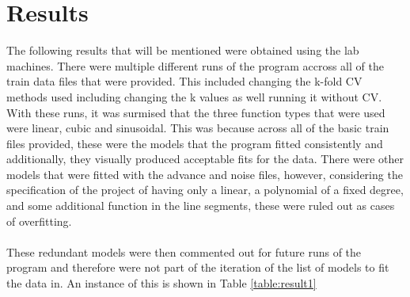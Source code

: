\documentclass[a4paper,11pt]{article}
\begin{document}
\section{Results}
The following results that will be mentioned were obtained using the lab machines.
There were multiple different runs of the program accross all of the train data
files that were provided. This included changing the k-fold CV methods used including
changing the k values as well running it without CV. With these runs, it was
surmised that the three function types that were used were linear, cubic and sinusoidal.
This was because across all of the basic train files provided, these were the models
that the program fitted consistently and additionally, they visually produced
acceptable fits for the data. There were other models that were fitted with the
advance and noise files, however, considering the specification of the project of
having only a linear, a polynomial of a fixed degree, and some additional function
in the line segments, these were ruled out as cases of overfitting.
\\ \\
These redundant models were then commented out for future runs of the program
and therefore were not part of the iteration of the list of models to fit the data
in. An instance of this is shown in Table \ref{table:result1}
\end{document}
